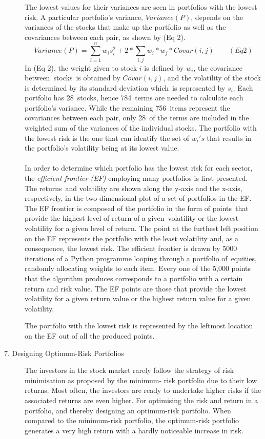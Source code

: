 \begin{description}
The lowest values for their variances are seen in portfolios with the lowest risk. A particular portfolio's variance, $Variance(P)$, depends on the variances of the stocks that make up the portfolio as well as the covariances between each pair, as shown by (Eq 2).
\[Variance(P) = \sum_{i = 1}^{n} w_{i}s_{i}^2 + 2*\sum_{i,j}w_{i}*w_{j}*Covar(i,j)\qquad(Eq 2)\]
In (Eq 2), the weight given to stock $i$ is defined by $w_{i}$, the covariance between stocks is obtained by $Covar(i,j)$, and the volatility of the stock is determined by its standard deviation which is represented by $s_{i}$. Each portfolio has 28 stocks, hence 784 terms are needed to calculate each portfolio's variance. While the remaining 756 items represent the covariances between each pair, only 28 of the terms are included in the weighted sum of the variances of the individual stocks. The portfolio with the lowest risk is the one that can identify the set of ${w_{i}}'s$ that results in the portfolio's volatility being at its lowest value.\\\\

In order to determine which portfolio has the lowest risk for each sector, the \textit{efficient frontier (EF)} employing many portfolios is first presented. The returns and volatility are shown along the y-axis and the x-axis, respectively, in the two-dimensional plot of a set of portfolios in the EF. The EF frontier is composed of the portfolio in the form of points that provide the highest level of return of a given volatility or the lowest volatility for a given level of return. The point at the furthest left position on the EF represents the portfolio with the least volatility and, as a consequence, the lowest risk. The efficient frontier is drawn by 5000 iterations of a Python programme looping through a portfolio of equities, randomly allocating weights to each item. Every one of the 5,000 points that the algorithm produces corresponds to a portfolio with a certain return and risk value. The EF points are those that provide the lowest volatility for a given return value or the highest return value for a given volatility.

The portfolio with the lowest risk is represented by the leftmost location on the EF out of all the produced points.
\item [7.  Designing Optimum-Risk Portfolios] The investors in the stock market rarely follow the
strategy of risk minimisation as proposed by the minimum-
risk portfolio due to their low returns. Most often, the
investors are ready to undertake higher risks if the associated
returns are even higher. For optimising the risk and return in
a portfolio, and thereby designing an optimum-risk portfolio.
When compared to the minimum-risk portfolio, the optimum-risk portfolio generates a very high return with a hardly noticeable increase in risk.


\end{description}
